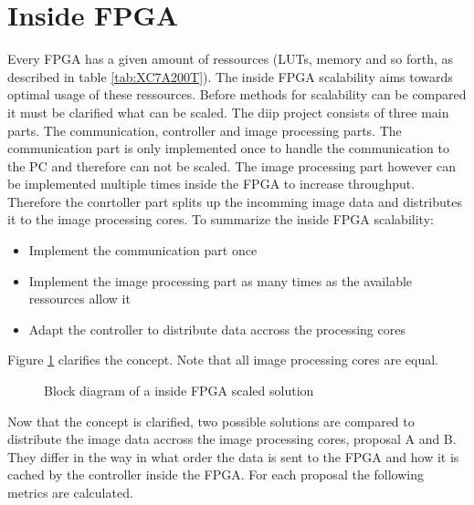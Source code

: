 \section{Inside FPGA} \label{chapt:sca:inside}
Every FPGA has a given amount of ressources (LUTs, memory and so forth, as
described in table \ref{tab:XC7A200T}). The inside FPGA scalability aims towards
optimal usage of these ressources. Before methods for scalability can be
compared it must be clarified what can be scaled. The \gls{diip} project
consists of three main parts. The communication, controller and image processing
parts. The communication part is only implemented once to handle the
communication to the PC and therefore can not be scaled. The image processing
part however can be implemented multiple times inside the FPGA to increase
throughput. Therefore the conrtoller part splits up the incomming image data and
distributes it to the image processing cores. To summarize the inside FPGA
scalability:
\begin{itemize}
    \item Implement the communication part once
    \item Implement the image processing part as many times as the available
    ressources allow it
    \item Adapt the controller to distribute data accross the processing cores
\end{itemize}

Figure \ref{fig:insidefpgascaleconceptbd} clarifies the concept. Note that all
image processing cores are equal.

\begin{figure}[tb!]
    \centering
    \begin{adjustbox}{max height=5cm}
        
    \end{adjustbox}
    \caption{Block diagram of a inside FPGA scaled solution}
    \label{fig:insidefpgascaleconceptbd}
\end{figure}

Now that the concept is clarified, two possible solutions are compared to
distribute the image data accross the image processing cores, proposal A and B.
They differ in the way in what order the data is sent to the FPGA and how it is
cached by the controller inside the FPGA. For each proposal the following
metrics are calculated.

